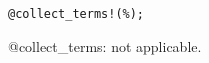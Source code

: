 \documentclass[11pt]{article}
\begin{document}
{\color[named]{Blue}\begin{verbatim}
@collect_terms!(%);
\end{verbatim}}
@collect\_terms: not applicable.
\end{document}
